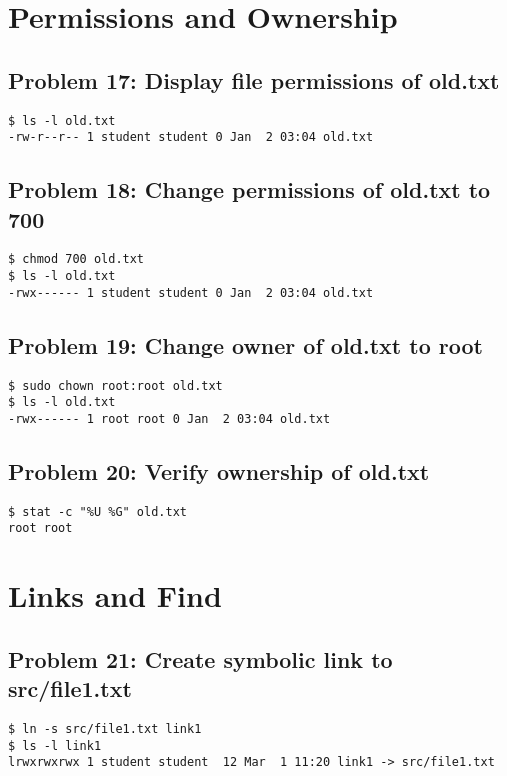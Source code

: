 \section{Permissions and Ownership}

\subsection*{Problem 17: Display file permissions of old.txt}
\begin{verbatim}
$ ls -l old.txt
-rw-r--r-- 1 student student 0 Jan  2 03:04 old.txt
\end{verbatim}

\subsection*{Problem 18: Change permissions of old.txt to 700}
\begin{verbatim}
$ chmod 700 old.txt
$ ls -l old.txt
-rwx------ 1 student student 0 Jan  2 03:04 old.txt
\end{verbatim}

\subsection*{Problem 19: Change owner of old.txt to root}
\begin{verbatim}
$ sudo chown root:root old.txt
$ ls -l old.txt
-rwx------ 1 root root 0 Jan  2 03:04 old.txt
\end{verbatim}

\subsection*{Problem 20: Verify ownership of old.txt}
\begin{verbatim}
$ stat -c "%U %G" old.txt
root root
\end{verbatim}

\section{Links and Find}

\subsection*{Problem 21: Create symbolic link to src/file1.txt}
\begin{verbatim}
$ ln -s src/file1.txt link1
$ ls -l link1
lrwxrwxrwx 1 student student  12 Mar  1 11:20 link1 -> src/file1.txt
\end{verbatim}

